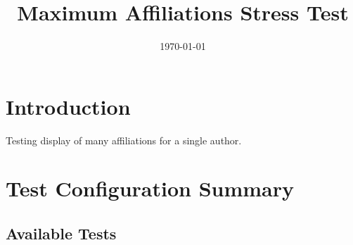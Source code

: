 \documentclass{article}
\begin{document}

\title{Maximum Affiliations Stress Test}
\author{}
\date{\today}
\maketitle

\section{Introduction}
Testing display of many affiliations for a single author.


\newpage
\section*{Test Configuration Summary}

\subsection*{Available Tests}
\end{document}
